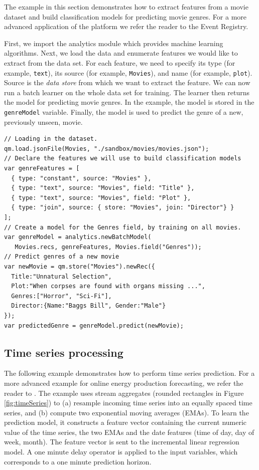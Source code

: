 \documentclass{article} %
\begin{document}
The example in this section demonstrates how to extract features from a movie dataset and build classification models for predicting movie genres. For a more advanced application of the platform we refer the reader to the Event Registry\cite{eventRegistry}.

First, we import the analytics module which provides machine learning algorithms. Next, we load the data and enumerate features we would like to extract from the data set. For each feature, we need to specify its type (for example, \texttt{text}), its source (for example, \texttt{Movies}), and name (for example, \texttt{plot}). Source is the \emph{data store} from which we want to extract the feature. We can now run a batch learner on the whole data set for training. The learner then returns the model for predicting movie genres. In the example, the model is stored in the \texttt{genreModel} variable. Finally, the model is used to predict the genre of a new, previously unseen, movie.

\begin{lstlisting}[caption={Example text mining: storage, feature extraction and classification.}] 	
// Loading in the dataset.
qm.load.jsonFile(Movies, "./sandbox/movies/movies.json");
// Declare the features we will use to build classification models
var genreFeatures = [
  { type: "constant", source: "Movies" },
  { type: "text", source: "Movies", field: "Title" },
  { type: "text", source: "Movies", field: "Plot" },
  { type: "join", source: { store: "Movies", join: "Director"} }
];
// Create a model for the Genres field, by training on all movies.
var genreModel = analytics.newBatchModel(
   Movies.recs, genreFeatures, Movies.field("Genres"));
// Predict genres of a new movie
var newMovie = qm.store("Movies").newRec({
  Title:"Unnatural Selection",
  Plot:"When corpses are found with organs missing ...",
  Genres:["Horror", "Sci-Fi"],
  Director:{Name:"Baggs Bill", Gender:"Male"}
});
var predictedGenre = genreModel.predict(newMovie);
\end{lstlisting}

\subsection{Time series processing}

The following example demonstrates how to perform time series prediction. For a more advanced example for online energy production forecasting, we refer the reader to \cite{energypredict}. The example uses stream aggregates (rounded rectangles in Figure \ref{fig:timeSeries}) to (a) resample incoming time series into an equally spaced time series, and (b) compute two exponential moving averages (EMAs). To learn the prediction model, it constructs a feature vector containing the current numeric value of the time series, the two EMAs and the date features (time of day, day of week, month). The feature vector is sent to the incremental linear regression model. A one minute delay operator is applied to the input variables, which corresponds to a one minute prediction horizon.
\end{document}
